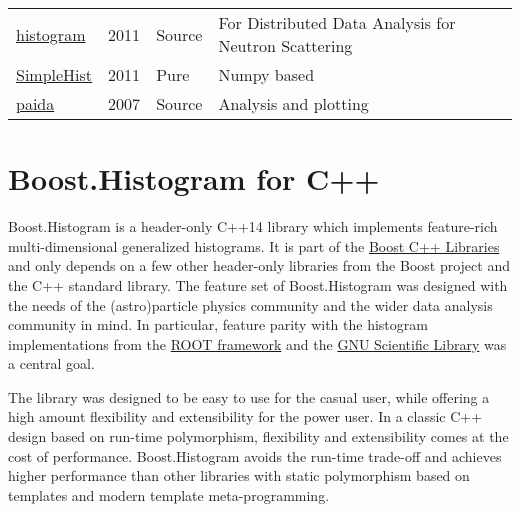 \documentclass{webofc}
\begin{document}
\begin{table}
\begin{tabular}{llll}
		\href{https://pypi.org/project/histogram}{histogram}                         & 2011         & Source & For Distributed Data Analysis for Neutron Scattering \\
		\href{https://pypi.org/project/SimpleHist/}{SimpleHist}                      & 2011         & Pure   & Numpy based                                          \\
		\href{https://pypi.org/project/paida/}{paida}                                & 2007         & Source & Analysis and plotting                                \\ \hline
	\end{tabular}
\end{table}

\section{Boost.Histogram for C++}
\label{sec-bh-cpp}

%

Boost.Histogram is a header-only C++14 library which implements feature-rich multi-dimensional generalized histograms. It is part of the \href{https://www.boost.org/}{Boost C++ Libraries} and only depends on a few other header-only libraries from the Boost project and the C++ standard library. The feature set of Boost.Histogram was designed with the needs of the (astro)particle physics community and the wider data analysis community in mind. In particular, feature parity with the histogram implementations from the \href{https://root.cern.ch/}{ROOT framework} and the \href{https://www.gnu.org/software/gsl/}{GNU Scientific Library} was a central goal.

The library was designed to be easy to use for the casual user, while offering a high amount flexibility and extensibility for the power user. In a classic C++ design based on run-time polymorphism, flexibility and extensibility comes at the cost of performance. Boost.Histogram avoids the run-time trade-off and achieves higher performance than other libraries with static polymorphism based on templates and modern template meta-programming.
\end{document}
